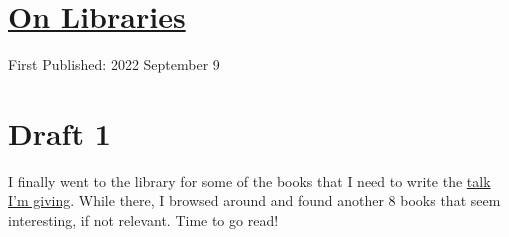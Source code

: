 \documentclass[12pt]{article}[titlepage]
\newcommand{\1}{\={a}}
\newcommand{\2}{\={e}}
\newcommand{\3}{\={\i}}
\newcommand{\4}{\=o}
\newcommand{\5}{\=u}
\newcommand{\6}{\={A}}
\renewcommand{\,}{\textsuperscript{,}}
\begin{document}
\doublespacing
\section{\href{libraries.html}{On Libraries}}
First Published: 2022 September 9
\section{Draft 1}
I finally went to the library for some of the books that I need to write the \href{talk-planning-1.html}{talk I'm giving}.
While there, I browsed around and found another 8 books that seem interesting, if not relevant.
Time to go read!
\end{document}
